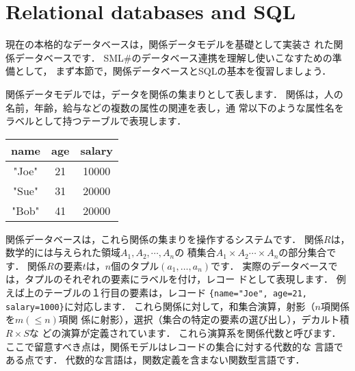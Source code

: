 \documentclass{jbook}
\newif\ifjp
\newcommand{\txt}[2]{#2}
\newcommand{\smlsharp}{SML\#}
\begin{document}
\section{\txt{関係データベースとSQL}{Relational databases and SQL}}
\label{sec:tutorialRelationalModel}

\ifjp%
	現在の本格的なデータベースは，関係データモデルを基礎として実装さ
れた関係データベースです．
	\smlsharp{}のデータベース連携を理解し使いこなすための準備として，
まず本節で，関係データベースとSQLの基本を復習しましょう．

	関係データモデルでは，データを関係の集まりとして表します．
	関係は，人の名前，年齢，給与などの複数の属性の関連を表し，通
常以下のような属性名をラベルとして持つテーブルで表現します．

\begin{center}
\begin{tabular}{|c|c|c|}
\hline
name & age & salary
\\\hline
"Joe" & 21 & 10000
\\\hline
"Sue" & 31 & 20000
\\\hline
"Bob" & 41 & 20000
\\\hline
\end{tabular}
\end{center}

	関係データベースは，これら関係の集まりを操作するシステムです．
	関係$R$は，数学的には与えられた領域$A_1,A_2,\cdots,A_n$の
積集合$A_1\times A_2 \cdots \times A_n$の部分集合です．
	関係$R$の要素$t$は，$n$個のタプル$(a_1,\ldots,a_n)$です．
	実際のデータベースでは，タプルのそれぞれの要素にラベルを付け，レコー
ドとして表現します．
	例えば上のテーブルの１行目の要素は，レコード
{\tt \{name="Joe", age=21, salary=1000\}}に対応します．
	これら関係に対して，和集合演算，射影（$n$項関係を$m (\le n)$項関
係に射影），選択（集合の特定の要素の選び出し），デカルト積 $R\times S$な
どの演算が定義されています．
	これら演算系を関係代数と呼びます．
	ここで留意すべき点は，関係モデルはレコードの集合に対する代数的な
言語である点です．
	代数的な言語は，関数定義を含まない関数型言語です．
\end{document}

